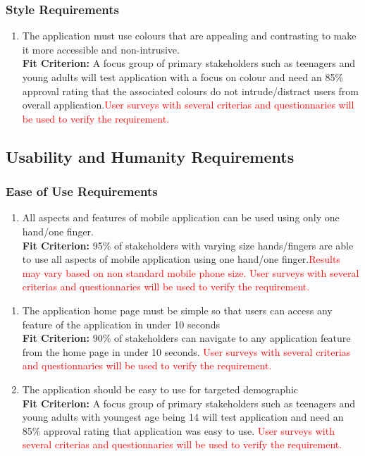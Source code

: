\documentclass[12pt,letterpaper]{article}
\begin{document}
\subsubsection{Style Requirements}
\begin{enumerate}[resume*]  
	\item The application must use colours that are appealing and contrasting to make it more accessible and non-intrusive.\\
	{\textbf{Fit Criterion:} A focus group of primary stakeholders such as teenagers and young adults will test application with a focus on colour and need an 85\% approval rating that the associated colours do not intrude/distract users from overall application.{\textcolor{red}{User surveys with several criterias and questionnaries will be used to verify the requirement.}}}
\end{enumerate}

\subsection{Usability and Humanity Requirements}
\subsubsection{Ease of Use Requirements}
\begin{enumerate}[{UH}1.] 
	\item All aspects and features of mobile application can be used using only one hand/one finger.\\
	{\textbf{Fit Criterion:} 95\% of stakeholders with varying size hands/fingers are able to use all aspects of mobile application using one hand/one finger.{\textcolor{red}{Results may vary based on non standard mobile phone size. User surveys with several criterias and questionnaries will be used to verify the requirement.}}}
\end{enumerate}
\begin{enumerate}[resume*]  
	\item The application home page must be simple so that users can access any feature of the application in under 10 seconds\\
	{\textbf{Fit Criterion:} 90\% of stakeholders can navigate to any application feature from the home page in under 10 seconds. {\textcolor{red}{User surveys with several criterias and questionnaries will be used to verify the requirement.}}}
	\item The application should be easy to use for targeted demographic\\
	{\textbf{Fit Criterion:} A focus group of primary stakeholders such as teenagers and young adults with youngest age being 14 will test application and need an 85\% approval rating that application was easy to use. {\textcolor{red}{User surveys with several criterias and questionnaries will be used to verify the requirement.}}}
\end{enumerate}
\end{document}
